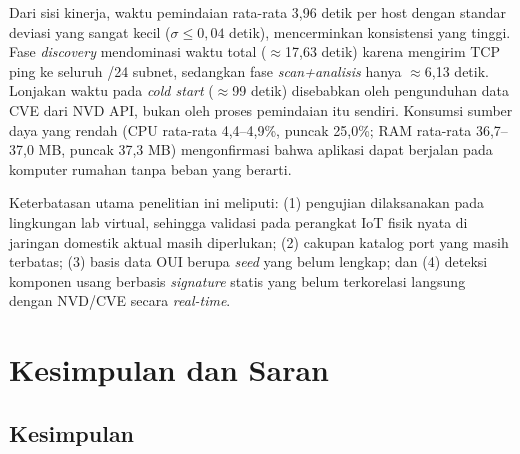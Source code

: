 \documentclass[conference]{IEEEtran}
\begin{document}
Dari sisi kinerja, waktu pemindaian rata-rata 3,96 detik per host dengan standar deviasi yang sangat kecil ($\sigma \leq 0{,}04$ detik), mencerminkan konsistensi yang tinggi. Fase \textit{discovery} mendominasi waktu total ($\approx$17,63 detik) karena mengirim TCP ping ke seluruh /24 subnet, sedangkan fase \textit{scan+analisis} hanya $\approx$6,13 detik. Lonjakan waktu pada \textit{cold start} ($\approx$99 detik) disebabkan oleh pengunduhan data CVE dari NVD API, bukan oleh proses pemindaian itu sendiri. Konsumsi sumber daya yang rendah (CPU rata-rata 4,4--4,9\%, puncak 25,0\%; RAM rata-rata 36,7--37,0 MB, puncak 37,3 MB) mengonfirmasi bahwa aplikasi dapat berjalan pada komputer rumahan tanpa beban yang berarti.

Keterbatasan utama penelitian ini meliputi: (1) pengujian dilaksanakan pada lingkungan lab virtual, sehingga validasi pada perangkat IoT fisik nyata di jaringan domestik aktual masih diperlukan; (2) cakupan katalog port yang masih terbatas; (3) basis data OUI berupa \textit{seed} yang belum lengkap; dan (4) deteksi komponen usang berbasis \textit{signature} statis yang belum terkorelasi langsung dengan NVD/CVE secara \textit{real-time}.

\section{Kesimpulan dan Saran}

\subsection{Kesimpulan}
\end{document}
